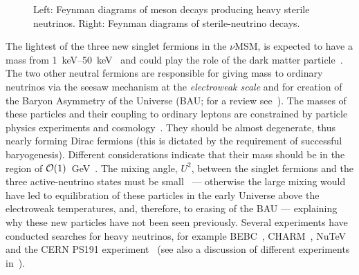 \begin{figure}[!htb]
\begin{minipage}[h]{0.45\textwidth}
\begin{center}
\begin{tikzpicture}[ultra thick,scale=0.25]
  \end{tikzpicture}
    \end{center}
  \end{minipage}
\caption[Feynman diagrams pertaining to sterile neutrinos]{Left: Feynman  diagrams of meson decays producing
heavy sterile neutrinos. Right: Feynman diagrams of sterile-neutrino decays.}
\label{fig:production-and-decays}
\end{figure}
The lightest of the three new singlet fermions in the $\nu$MSM, is
expected to have a mass from \SIrange{1}{50}{\keV}~\cite{Boyarsky:2009ix} 
and could play the role of the dark matter particle~\cite{Dodelson:1993je}. 
The two other neutral fermions are
responsible for giving mass to ordinary neutrinos via the seesaw
mechanism at the {\em electroweak scale} and for creation of the
Baryon Asymmetry of the Universe (BAU; for a review
see~\cite{Boyarsky:2009ix}). The masses of these particles and their
coupling to ordinary leptons are constrained by particle physics
experiments and cosmology~\cite{Gorbunov:2007ak,Atre:2009rg}. 
They should be almost degenerate, thus nearly forming Dirac fermions (this is
dictated by the requirement of successful baryogenesis). Different
considerations indicate that their mass should be in the region of
${\cal O}(1)$~GeV~\cite{Shaposhnikov:2008pf}.  The mixing angle,
$U^2$, between the singlet fermions and the three active-neutrino
states must be small~\cite{Asaka:2005pn,Akhmedov:1998qx} 
--- otherwise the large mixing
would have led to equilibration of these particles in the early
Universe above the electroweak temperatures, and, therefore, to
erasing of the BAU --- explaining why these new particles
have not been seen previously.
Several experiments have conducted searches for heavy neutrinos, for
example BEBC~\cite{CooperSarkar:1985nh}, \linebreak
CHARM~\cite{Bergsma:1985is},
NuTeV~\cite{Vaitaitis:1999wq} and the CERN PS191
experiment~\cite{Bernardi:1985ny,Bernardi:1987ek} (see also a discussion
of different experiments in~\cite{Atre:2009rg}). 
